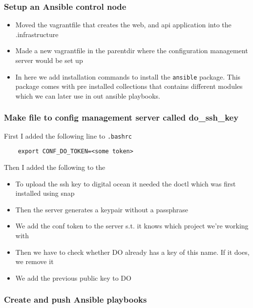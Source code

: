 \subsubsection{Setup an Ansible control node}
\label{log:setup-an-ansible-control-node}

\begin{itemize}
    \item Moved the vagrantfile that creates the web, and api application into the .infrastructure
    \item Made a new vagrantfile in the parentdir where the configuration management server would be set up
    \item In here we add installation commands to install the \texttt{ansible} package. This package comes with pre installed collections that contains different modules which we can later use in out ansible playbooks.
\end{itemize}

\hypertarget{make-file-to-config-management-server-called-do_ssh_key}{%
\subsubsection{Make file to config management server called
do\_ssh\_key}\label{make-file-to-config-management-server-called-do_ssh_key}}

First I added the following line to \texttt{.bashrc}

\begin{verbatim}
    export CONF_DO_TOKEN=<some token>
\end{verbatim}

Then I added the following to the

\begin{itemize}
    \item To upload the ssh key to digital ocean it needed the doctl which was first installed using snap
    \item Then the server generates a keypair without a passphrase
    \item We add the conf token to the server s.t. it knows which project we're working with
    \item Then we have to check whether DO already has a key of this name. If it does, we remove it
    \item We add the previous public key to DO
\end{itemize}

\subsubsection{Create and push Ansible playbooks}
\label{log:create-and-push-ansible-playbooks}

